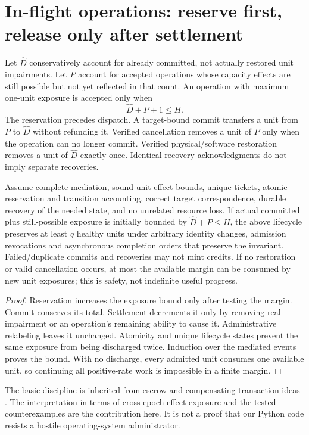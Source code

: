 \section{In-flight operations: reserve first, release only after settlement}
\label{sec:escrow}
Let $\widehat D$ conservatively account for already committed, not actually restored unit impairments. Let $P$ account for accepted operations whose capacity effects are still possible but not yet reflected in that count. An operation with maximum one-unit exposure is accepted only when
\begin{equation}
\widehat D+P+1\le H.
\label{eq:reserve}
\end{equation}
The reservation precedes dispatch. A target-bound commit transfers a unit from $P$ to $\widehat D$ without refunding it. Verified cancellation removes a unit of $P$ only when the operation can no longer commit. Verified physical/software restoration removes a unit of $\widehat D$ exactly once. Identical recovery acknowledgments do not imply separate recoveries.

\begin{theorem}
\label{thm:escrow}
Assume complete mediation, sound unit-effect bounds, unique tickets, atomic reservation and transition accounting, correct target correspondence, durable recovery of the needed state, and no unrelated resource loss. If actual committed plus still-possible exposure is initially bounded by $\widehat D+P\le H$, the above lifecycle preserves at least $q$ healthy units under arbitrary identity changes, admission revocations and asynchronous completion orders that preserve the invariant. Failed/duplicate commits and recoveries may not mint credits. If no restoration or valid cancellation occurs, at most the available margin can be consumed by new unit exposures; this is safety, not indefinite useful progress.
\end{theorem}
\begin{proof}
Reservation increases the exposure bound only after testing the margin. Commit conserves its total. Settlement decrements it only by removing real impairment or an operation's remaining ability to cause it. Administrative relabeling leaves it unchanged. Atomicity and unique lifecycle states prevent the same exposure from being discharged twice. Induction over the mediated events proves the bound. With no discharge, every admitted unit consumes one available unit, so continuing all positive-rate work is impossible in a finite margin.
\end{proof}
The basic discipline is inherited from escrow and compensating-transaction ideas \cite{escrow,sagas}. The interpretation in terms of cross-epoch effect exposure and the tested counterexamples are the contribution here. It is not a proof that our Python code resists a hostile operating-system administrator.

